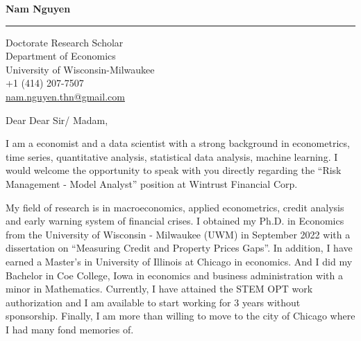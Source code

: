 \documentclass[12pt]{letter} %
\begin{document}
\signature{\vspace{-25pt}Nam Nguyen}           %
\longindentation=0pt                      %
\vspace{-10pt}\let\raggedleft\raggedright              %


\begin{letter}%
	
	
\date{\today}


\begin{flushleft}
\textbf{Nam Nguyen}
\end{flushleft}
\hrule height 1pt
\begin{flushright}
\hfill Doctorate Research Scholar \\ \hfill Department of Economics \\ \hfill University of Wisconsin-Milwaukee \\ \hfill +1 (414) 207-7507 \\ \hfill \href{mailto:nam.nguyen.thn@gmail.com}{nam.nguyen.thn@gmail.com} %
\end{flushright} 
 
 
\vspace*{-10pt}

\opening{}

\vspace{-10pt} Dear Dear Sir/ Madam,

I am a economist and a data scientist with a strong background in econometrics, time series, quantitative analysis, statistical data analysis, machine learning. I would welcome the opportunity to speak with you directly regarding the “Risk Management - Model Analyst” position at Wintrust Financial Corp.

My field of research is in macroeconomics, applied econometrics, credit analysis and early warning system of financial crises. I obtained my Ph.D. in Economics from the University of Wisconsin - Milwaukee (UWM) in September 2022 with a dissertation on ``Measuring Credit and Property Prices Gaps''. In addition, I have earned a Master's in University of Illinois at Chicago in economics. And I did my Bachelor in Coe College, Iowa in economics and business administration with a minor in Mathematics. Currently, I have attained the STEM OPT work authorization and I am available to start working for 3 years without sponsorship. Finally, I am more than willing to move to the city of Chicago where I had many fond memories of.


\end{letter}
\end{document}
